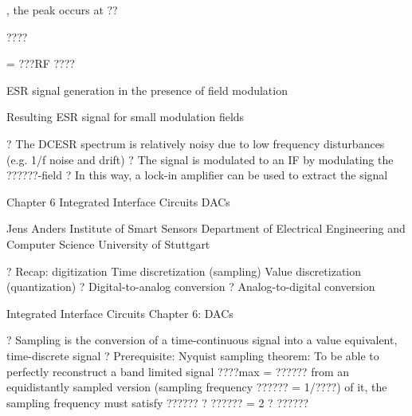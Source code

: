 \documentclass[2pt,landscape]{article}
\begin{document}
\begin{multicols*}{5}
, the peak occurs at ??



????


= ???RF
????


ESR signal generation in the 
presence of field modulation


Resulting ESR signal 
for small 
modulation 
fields

























?	The \textbullet DC\textbullet ESR spectrum is relatively noisy due to low frequency
disturbances (e.g. 1/f noise and drift)
?	The signal is modulated to an IF by modulating the ??????-field
?	In this way, a lock-in amplifier can be used to extract the signal








Chapter 6
Integrated Interface Circuits \textbullet 
DACs

Jens Anders 
Institute of Smart Sensors
Department of Electrical Engineering and Computer 
Science
University of Stuttgart



?	Recap: digitization
\textbullet 	Time discretization (sampling)
\textbullet 	Value discretization (quantization)
?	Digital-to-analog conversion
?	Analog-to-digital conversion


























Integrated Interface Circuits \textbullet Chapter 6: DACs



?	Sampling is the conversion of a time-continuous signal into a value 
equivalent, time-discrete signal
?	Prerequisite: Nyquist sampling theorem:
To be able to perfectly reconstruct a band limited signal  ????max  = ?????? 
from an equidistantly sampled version (sampling frequency ??????  = 1/????) 
of it, the sampling frequency must satisfy ??????  ? ??????  = 2 ? ??????






\end{multicols*}
\end{document}
